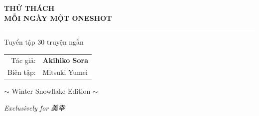 
\thispagestyle{empty}
\vspace*{2cm}

\begin{center}
    {\titlefont\LARGE
        \textbf{THỬ THÁCH}\\[0.4cm]
        \textbf{MỖI NGÀY MỘT ONESHOT}
    }
    
    \vspace{0.8cm}
    \textcolor{winter_blue}{\rule{3cm}{0.5pt}}
    \vspace{0.8cm}
    
    {\large Tuyển tập 30 truyện ngắn}
    
    \vfill
    
    \begin{tabular}{rl}
        \textcolor{winter_blue}{\small Tác giả:} & \textbf{Akihiko Sora} \\[0.3cm]
        \textcolor{winter_blue}{\small Biên tập:} & Mitsuki Yumei \\
    \end{tabular}
    
    \vspace{1.5cm}
    
    {\small\textcolor{winter_blue}{$\sim$ Winter Snowflake Edition $\sim$}}
    
    \vspace{0.5cm}
    
    {\footnotesize\textcolor{frost_blue}{\textit{Exclusively for {\japanesefont 美幸}}}}
    \vspace{1cm}
\end{center}

\clearpage